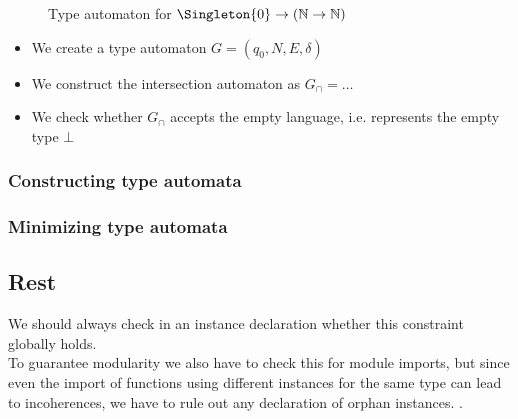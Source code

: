 \begin{figure}
  \centering
  \caption{Type automaton for $\Singleton{0} \to (\Nat \to \Nat)$}
  \label{fig:example-type-automaton}
\end{figure}

\begin{itemize}
  \item We create a type automaton $G = (q_0, N, E, \delta)$
  \item We construct the intersection automaton as $G_\cap = \dots$
  \item We check whether $G_\cap$ accepts the empty language, i.e. represents the empty type $\bot$
\end{itemize}

\subsubsection{Constructing type automata}
\subsubsection{Minimizing type automata}


\subsection{Rest}
We should always check in an instance declaration whether this constraint globally holds. \\
To guarantee modularity we also have to check this for module imports, but since even the import of functions using different instances for the same type can lead to incoherences, we have to rule out any declaration of orphan instances.
\cite{Kilpatrick2019-cy}.